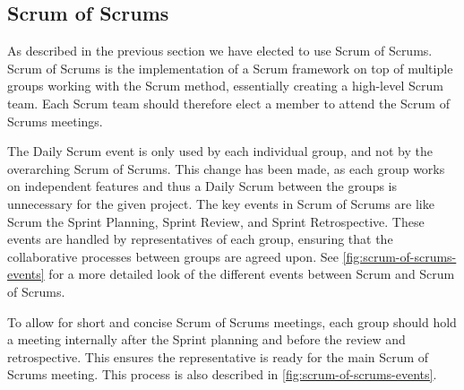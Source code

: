 \subsection{Scrum of Scrums}\label{sub:scrum-of-scrums}
As described in the previous section we have elected to use Scrum of Scrums. Scrum of Scrums is the implementation of a Scrum framework on top of multiple groups working with the Scrum method, essentially creating a high-level Scrum team. Each Scrum team should therefore elect a member to attend the Scrum of Scrums meetings.

The Daily Scrum event is only used by each individual group, and not by the overarching Scrum of Scrums. This change has been made, as each group works on independent features and thus a Daily Scrum between the groups is unnecessary for the given project.
The key events in Scrum of Scrums are like Scrum the Sprint Planning, Sprint Review, and Sprint Retrospective. These events are handled by representatives of each group, ensuring that the collaborative processes between groups are agreed upon.
See \autoref{fig:scrum-of-scrums-events} for a more detailed look of the different events between Scrum and Scrum of Scrums.

To allow for short and concise Scrum of Scrums meetings, each group should hold a meeting internally after the Sprint planning and before the review and retrospective. This ensures the representative is ready for the main Scrum of Scrums meeting. This process is also described in \autoref{fig:scrum-of-scrums-events}.


